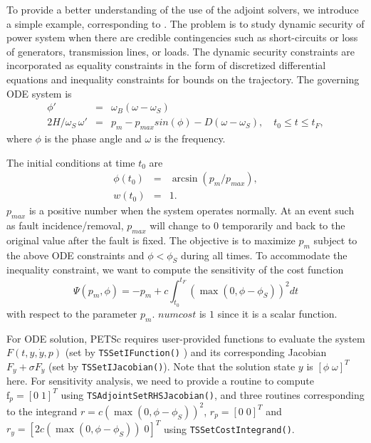 {To provide a better understanding of the use of the adjoint solvers, we introduce a simple example, corresponding to \href{http://www.mcs.anl.gov/petsc/petsc-current/src/ts/examples/tutorials/power_grid/ex3adj.c.html}{}.
The problem is to study dynamic security of power system when there are credible contingencies such as short-circuits or loss of generators, transmission lines, or loads.
The dynamic security constraints are incorporated as equality constraints in the form of discretized differential equations and inequality constraints for bounds on the trajectory.
The governing ODE system is
\begin{eqnarray*}
    \phi' &= &\omega_B (\omega - \omega_S)  \\
    2H/\omega_S \, \omega' & =& p_m - p_{max} sin(\phi) -D (\omega - \omega_S), \quad t_0 \leq t \leq t_F,
\end{eqnarray*}
where $\phi$ is the phase angle and $\omega$ is the frequency.

The initial conditions at time $t_0$ are
%
\begin{eqnarray*}
\phi(t_0) &=& \arcsin \left( p_m / p_{max} \right), \\
w(t_0) & =& 1.
\end{eqnarray*}
%
$p_{max}$ is a positive number when the system operates normally. At an event such as fault incidence/removal, $p_{max}$ will change to $0$ temporarily and back to the original value after the fault is fixed.
The objective is to maximize $p_m$ subject to the above ODE constraints and $\phi<\phi_S$ during all times.
To accommodate the inequality constraint, we want to compute the sensitivity of the cost function
%
\[
\Psi(p_m,\phi) = -p_m + c \int_{t_0}^{t_F} \left( \max(0, \phi - \phi_S ) \right)^2 dt
\]
%
with respect to the parameter $p_m$. $numcost$ is $1$ since it is a scalar function.

For ODE solution, PETSc requires user-provided functions to evaluate the system $F(t,y,\dot{y},p)$ (set by \lstinline{TSSetIFunction()} )
and its corresponding Jacobian $F_y + \sigma F_{\dot y}$ (set by \lstinline{TSSetIJacobian()}).
Note that the solution state $y$ is $[ \phi \;  \omega ]^T$ here.
For sensitivity analysis, we need to provide a routine to compute $\mathrm{f}_p=[0 \; 1]^T$ using \lstinline{TSAdjointSetRHSJacobian()},
and three routines corresponding to the integrand $r=c \left( \max(0, \phi - \phi_S ) \right)^2$, $r_p = [0 \; 0]^T$ and $r_y= [ 2 c \left( \max(0, \phi - \phi_S ) \right) \; 0]^T$ using \lstinline{TSSetCostIntegrand()}.

}
